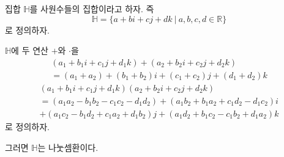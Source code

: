 \documentclass{article}
\begin{document}
집합 \(\mathbb H\)를 사원수들의 집합이라고 하자.
즉
\[\mathbb H=\{a+bi+cj+dk\:|\:a,b,c,d\in\mathbb R\}\]
로 정의하자.

\(\mathbb H\)에 두 연산 \(+\)와 \(\cdot\)을
\begin{multline}
(a_1+b_1i+c_1j+d_1k)+(a_2+b_2i+c_2j+d_2k)\\=(a_1+a_2)+(b_1+b_2)i+(c_1+c_2)j+(d_1+d_2)k
\end{multline}
\begin{multline}
(a_1+b_1i+c_1j+d_1k)
(a_2+b_2i+c_2j+d_2k)
\\=(a_1a_2-b_1b_2-c_1c_2-d_1d_2)
+(a_1b_2+b_1a_2+c_1d_2-d_1c_2)i
\\+(a_1c_2-b_1d_2+c_1a_2+d_1b_2)j
+(a_1d_2+b_1c_2-c_1b_2+d_1a_2)k
\end{multline}
로 정의하자.

그러면 \(\mathbb H\)는 나눗셈환이다.
\end{document}
